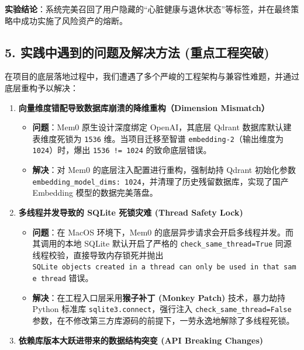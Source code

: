 \documentclass[
]{article}
\providecommand{\tightlist}{%
  \setlength{\itemsep}{0pt}\setlength{\parskip}{0pt}}
\begin{document}
\textbf{实验结论}：系统完美召回了用户隐藏的``心脏健康与退休状态''等标签，并在最终策略中成功实施了风险资产的熔断。

\subsection{5. 实践中遇到的问题及解决方法
(重点工程突破)}\label{ux5b9eux8df5ux4e2dux9047ux5230ux7684ux95eeux9898ux53caux89e3ux51b3ux65b9ux6cd5-ux91cdux70b9ux5de5ux7a0bux7a81ux7834}

在项目的底层落地过程中，我们遭遇了多个严峻的工程架构与兼容性难题，并通过底层重构予以解决：

\begin{enumerate}
\def\labelenumi{\arabic{enumi}.}
\tightlist
\item
  \textbf{向量维度错配导致数据库崩溃的降维重构（Dimension Mismatch）}

  \begin{itemize}
  \tightlist
  \item
    \textbf{问题}：Mem0 原生设计深度绑定 OpenAI，其底层 Qdrant
    数据库默认建表维度死锁为 \texttt{1536} 维。当项目迁移至智谱
    \texttt{embedding-2}（输出维度为 \texttt{1024}）时，爆出
    \texttt{1536\ !=\ 1024} 的致命底层错误。
  \item
    \textbf{解决}：对 Mem0 的底层注入配置进行重构，强制劫持 Qdrant
    初始化参数
    \texttt{embedding\_model\_dims:\ 1024}，并清理了历史残留数据库，实现了国产
    Embedding 模型的数据完美落盘。
  \end{itemize}
\item
  \textbf{多线程并发导致的 SQLite 死锁灾难 (Thread Safety Lock)}

  \begin{itemize}
  \tightlist
  \item
    \textbf{问题}：在 MacOS 环境下，Mem0
    的底层异步请求会开启多线程并发。而其调用的本地 SQLite
    默认开启了严格的 \texttt{check\_same\_thread=True}
    同源线程校验，直接导致内存锁死并抛出
    \texttt{SQLite\ objects\ created\ in\ a\ thread\ can\ only\ be\ used\ in\ that\ same\ thread}
    错误。
  \item
    \textbf{解决}：在工程入口层采用\textbf{猴子补丁 (Monkey Patch)}
    技术，暴力劫持 Python 标准库 \texttt{sqlite3.connect}，强行注入
    \texttt{check\_same\_thread=False}
    参数，在不修改第三方库源码的前提下，一劳永逸地解除了多线程死锁。
  \end{itemize}
\item
  \textbf{依赖库版本大跃进带来的数据结构突变 (API Breaking Changes)}


\end{enumerate}
\end{document}
